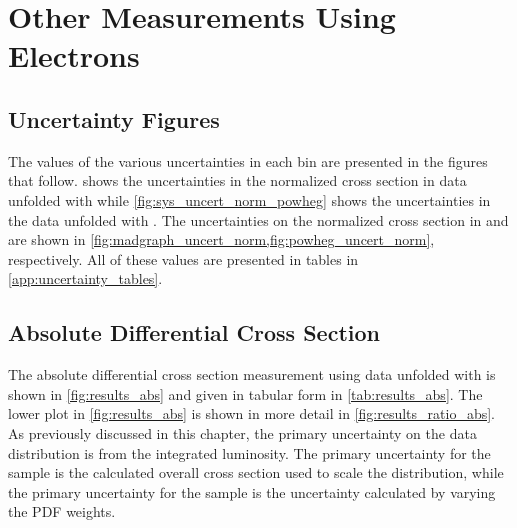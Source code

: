 \chapter{Other Measurements Using \Dressed Electrons}
\label{app:dressed_measurements}

\section{Uncertainty Figures}

The values of the various uncertainties in each \phistar bin are presented in the
figures that follow.  shows the uncertainties in the
normalized \phistar cross section in data unfolded with \MADGRAPH while
\cref{fig:sys_uncert_norm_powheg} shows the uncertainties in the data unfolded
with \POWHEG. The uncertainties on the normalized \phistar cross section in
\MADGRAPH and \POWHEG are shown in
\cref{fig:madgraph_uncert_norm,fig:powheg_uncert_norm}, respectively. All of
these values are presented in tables in \cref{app:uncertainty_tables}.











\section{Absolute Differential Cross Section}
\label{sec:results_abs}

The absolute differential cross section measurement using data unfolded with
\MADGRAPH is shown in \cref{fig:results_abs} and given in tabular form in
\cref{tab:results_abs}. The lower plot in \cref{fig:results_abs} is
shown in more detail in \cref{fig:results_ratio_abs}. As previously
discussed in this chapter, the primary uncertainty on the data distribution is
from the integrated luminosity. The primary uncertainty for the
\MADGRAPH sample is the \FEWZ calculated overall cross section used to scale
the distribution, while the primary uncertainty for the \POWHEG sample is the
uncertainty calculated by varying the \CTten PDF weights.

